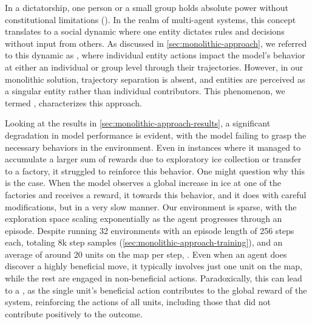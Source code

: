 \noindent In a dictatorship, one person or a small group holds absolute power without constitutional limitations (\cite{VocabularyDictatorship}). In the realm of multi-agent systems, this concept translates to a social dynamic where one entity dictates rules and decisions without input from others. As discussed in \autoref{sec:monolithic-approach}, we referred to this dynamic as , where individual entity actions impact the model's behavior at either an individual or group level through their trajectories. However, in our monolithic solution, trajectory separation is absent, and entities are perceived as a singular entity rather than individual contributors. This phenomenon, we termed , characterizes this approach.

\bigskip

\noindent Looking at the results in \autoref{sec:monolithic-approach-results}, a significant degradation in model performance is evident, with the model failing to grasp the necessary behaviors in the environment. Even in instances where it managed to accumulate a larger sum of rewards due to exploratory ice collection or transfer to a factory, it struggled to reinforce this behavior. One might question why this is the case. When the model observes a global increase in ice at one of the factories and receives a reward, it  towards this behavior, and it does with careful modifications, but in a very slow manner. Our environment is sparse, with the exploration space scaling exponentially as the agent progresses through an episode. Despite running 32 environments with an episode length of 256 steps each, totaling 8k step samples (\autoref{sec:monolithic-approach-training}), and an average of around 20 units on the map per step, . Even when an agent does discover a highly beneficial move, it typically involves just one unit on the map, while the rest are engaged in non-beneficial actions. Paradoxically, this can lead to a , as the single unit's beneficial action contributes to the global reward of the system, reinforcing the actions of all units, including those that did not contribute positively to the outcome.

\bigskip

